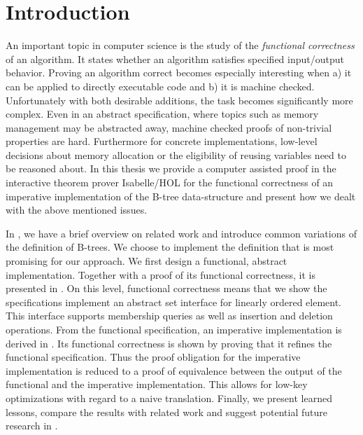 

\chapter{Introduction}\label{chapter:introduction}

An important topic in computer science is the study of the
\textit{functional correctness} of an algorithm.
It states whether an algorithm satisfies specified
input/output behavior.
Proving an algorithm correct
becomes especially interesting when a) it can be applied
to directly executable code and b) it is machine checked.
Unfortunately with both desirable additions, the task becomes
significantly more complex.
Even in an abstract specification, where topics such as
memory management may be abstracted away,
machine checked proofs of non-trivial properties
are hard.
Furthermore for concrete implementations,
low-level decisions about memory allocation or
the eligibility of reusing variables need to be
reasoned about.
In this thesis we provide a computer assisted proof in the interactive
theorem prover Isabelle/HOL for the functional
correctness of an imperative implementation of the B-tree data-structure
and present how we dealt with the above mentioned issues.

In , we have a brief overview on related
work and introduce common variations of the definition of B-trees.
We choose to implement the definition that is most promising for our approach.
We first design a functional, abstract implementation.
Together with a proof of its functional correctness,
it is presented in .
On this level, functional correctness means that we show the specifications
implement an abstract set interface for linearly ordered element.
This interface supports membership queries as well as insertion and deletion operations.
From the functional specification, an imperative implementation is derived in .
Its functional correctness is shown by proving that it refines the functional specification.
Thus the proof obligation for the imperative implementation
is reduced to a proof of equivalence between the output of the
functional and the imperative implementation.
This allows for low-key optimizations with regard to a naive translation.
Finally, we present learned lessons, compare the results with related work and suggest potential future
research in .

